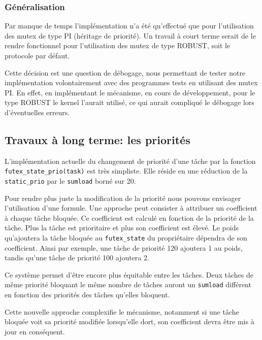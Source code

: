 \subsubsection{Généralisation}
Par manque de temps l'implémentation n'a été qu'effectué que pour l'utilisation des mutex de type PI 
(héritage de priorité). Un travail à court terme serait de le rendre
fonctionnel pour l'utilisation des mutex de type ROBUST, soit le protocole par défaut.

Cette décision est une question de débogage, nous permettant 
de tester notre implémentation volontairement avec des programmes tests en utilisant
des mutex PI. En effet, en implémentant le mécanisme, en cours de développement,
 pour le type ROBUST le kernel l'aurait utilisé, ce qui aurait compliqué le débogage lors d'éventuelles erreurs.

\subsection{Travaux à long terme: les priorités}
L'implémentation actuelle du changement de priorité d'une tâche par la fonction \verb|futex_state_prio(task)| 
est très simpliste. Elle réside en une réduction de la \verb|static_prio| par le \verb|sumload| 
borné sur 20.

Pour rendre plus juste la modification de la priorité nous pouvons envisager l'utilisation d'une formule.
Une approche peut consister à attribuer un coefficient à chaque tâche bloquée. 
Ce coefficient est calculé en fonction de la priorité de la tâche. 
Plus la tâche est prioritaire et plus son coefficient est élevé.
Le poids qu'ajoutera la tâche bloquée au \verb|futex_state| du propriétaire dépendra de son coefficient.
Ainsi par exemple, une tâche de priorité 120 ajoutera 1 au poids, tandis qu'une tâche de priorité 100
ajoutera 2. 

Ce système permet d'être encore plus équitable entre les tâches. Deux tâches de même priorité bloquant
le même nombre de tâches auront un \verb|sumload| différent en fonction des priorités des tâches qu'elles bloquent.

Cette nouvelle approche complexifie le mécanisme, notamment si une tâche bloquée voit sa priorité modifiée
lorsqu'elle dort, son coefficient devra être mis à jour en conséquent.

